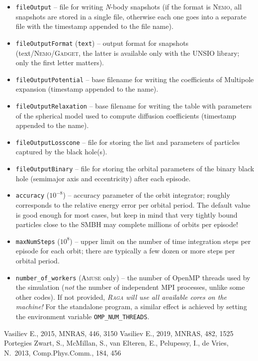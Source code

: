 \documentclass[12pt]{article}
\newcommand{\Nbody}{\textsl{N}-body\xspace}
\newcommand{\Raga}{\textsc{Raga}\xspace}
\newcommand{\Amuse}{\textsc{Amuse}\xspace}
\newcommand{\Nemo}{\textsc{Nemo}\xspace}
\begin{document}
\begin{itemize}
\item \texttt{fileOutput}  -- file for writing \Nbody snapshots (if the format is \Nemo, all snapshots are stored in a single file, otherwise each one goes into a separate file with the timestamp appended to the file name).
\item \texttt{fileOutputFormat}  (\texttt{text}) -- output format for snapshots (text/\Nemo/\textsc{Gadget}, the latter is available only with the UNSIO library; only the first letter matters).
\item \texttt{fileOutputPotential}  -- base filename for writing the coefficients of Multipole expansion (timestamp appended to the name).
\item \texttt{fileOutputRelaxation}  -- base filename for writing the table with parameters of the spherical model used to compute diffusion coefficients (timestamp appended to the name).
\item \texttt{fileOutputLosscone}  -- file for storing the list and parameters of particles captured by the black hole(s).
\item \texttt{fileOutputBinary}  -- file for storing the orbital parameters of the binary black hole (semimajor axis and eccentricity) after each episode.
\item \texttt{accuracy}  ($10^{-8}$) -- accuracy parameter of the orbit integrator; roughly corresponds to the relative energy error per orbital period. The default value is good enough for most cases, but keep in mind that very tightly bound particles close to the SMBH may complete millions of orbits per episode!
\item \texttt{maxNumSteps}  ($10^8$) -- upper limit on the number of time integration steps per episode for each orbit; there are typically a few dozen or more steps per orbital period.
\item \texttt{number_of_workers} (\Amuse only) -- the number of OpenMP threads used by the simulation (\textit{not} the number of independent MPI processes, unlike some other codes). If not provided, \textit{\Raga will use all available cores on the machine!} For the standalone program, a similar effect is achieved by setting the environment variable \texttt{OMP_NUM_THREADS}.
\end{itemize}

\begin{thebibliography}{1}
 Vasiliev E., 2015, MNRAS, 446, 3150
 Vasiliev E., 2019, MNRAS, 482, 1525
 Portegies Zwart, S., McMillan, S., van Elteren, E., Pelupessy, I., de Vries, N.\ 2013, Comp.Phys.Comm., 184, 456
\end{thebibliography}
\end{document}
